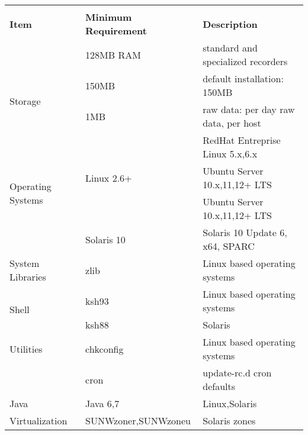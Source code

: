 \begin{center}
\begin{tabular}{lll}

\multicolumn{3}{c}{} \\
 \rowcolor{blue!25}
 \textbf{Item} & \textbf{Minimum Requirement} & \textbf{Description} \\
 \hline
 \newline

\multirow{1}{*}{\small{Memory}} &
 \small{128MB RAM} & \small{standard and specialized recorders} \\
 \hline

\multirow{2}{*}{\small{Storage}} &
 \small{150MB} & \small{default installation: 150MB} \\ &
 \small{1MB} & \small{raw data: per day raw data, per host} \\
 \hline

\multirow{4}{*}{\small{Operating Systems}} &
 \small{} & \small{RedHat Entreprise Linux 5.x,6.x} \\ &
 \small{Linux 2.6+} & \small{Ubuntu Server 10.x,11,12+ LTS} \\ &
 \small{} & \small{Ubuntu Server 10.x,11,12+ LTS} \\ &
 \small{Solaris 10} & \small{Solaris 10 Update 6, x64, SPARC} \\
 \hline

\multirow{1}{*}{\small{System Libraries}} &
 \small{zlib} & \small{Linux based operating systems} \\
 \hline

\multirow{2}{*}{\small{Shell}} &
 \small{ksh93} & \small{Linux based operating systems} \\ &
 \small{ksh88} & \small{Solaris} \\
 \hline

\multirow{1}{*}{\small{Utilities}} &
 \small{chkconfig} & \small{Linux based operating systems} \\ &
 \small{cron} & \small{update-rc.d cron defaults} \\
 \hline

\multirow{1}{*}{\small{Java}} &
 \small{Java 6,7} & \small{Linux,Solaris} \\
 \hline

\multirow{1}{*}{\small{Virtualization}} &
 \small{SUNWzoner,SUNWzoneu} & \small{Solaris zones}

\end{tabular}
\end{center}



